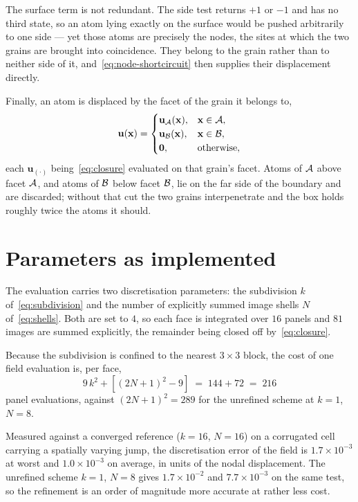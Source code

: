 The surface term is not redundant. The side test returns $+1$ or $-1$ and has no
third state, so an atom lying exactly on the surface would be pushed arbitrarily
to one side --- yet those atoms are precisely the nodes, the sites at which the
two grains are brought into coincidence. They belong to the grain rather than to
neither side of it, and~\eqref{eq:node-shortcircuit} then supplies their
displacement directly.

Finally, an atom is displaced by the facet of the grain it belongs to,
\begin{equation}
  \mathbf{u}(\mathbf{x}) =
  \begin{cases}
    \mathbf{u}_{\mathcal{A}}(\mathbf{x}), & \mathbf{x} \in \mathcal{A} ,\\
    \mathbf{u}_{\mathcal{B}}(\mathbf{x}), & \mathbf{x} \in \mathcal{B} ,\\
    \mathbf{0},                  & \text{otherwise},
  \end{cases}
  \label{eq:dispatch}
\end{equation}
each $\mathbf{u}_{(\cdot)}$ being~\eqref{eq:closure} evaluated on that grain's
facet. Atoms of $\mathcal{A}$ above facet $\mathcal{A}$, and atoms of $\mathcal{B}$ below facet $\mathcal{B}$, lie on
the far side of the boundary and are discarded; without that cut the two grains
interpenetrate and the box holds roughly twice the atoms it should.

\section*{Parameters as implemented}

The evaluation carries two discretisation parameters: the subdivision $k$
of~\eqref{eq:subdivision} and the number of explicitly summed image shells $N$
of~\eqref{eq:shells}. Both are set to $4$, so each face is integrated over $16$
panels and $81$ images are summed explicitly, the remainder being closed off
by~\eqref{eq:closure}.

Because the subdivision is confined to the nearest $3\times3$ block, the cost of
one field evaluation is, per face,
\begin{equation}
  9\,k^{2} + \left[ (2N+1)^{2} - 9 \right]
  \;=\; 144 + 72 \;=\; 216
  \label{eq:cost}
\end{equation}
panel evaluations, against $(2N+1)^{2} = 289$ for the unrefined scheme at
$k=1$, $N=8$.

Measured against a converged reference ($k=16$, $N=16$) on a corrugated cell
carrying a spatially varying jump, the discretisation error of the field is
$1.7\times10^{-3}$ at worst and $1.0\times10^{-3}$ on average, in units of the
nodal displacement. The unrefined scheme $k=1$, $N=8$ gives $1.7\times10^{-2}$
and $7.7\times10^{-3}$ on the same test, so the refinement is an order of
magnitude more accurate at rather less cost.

